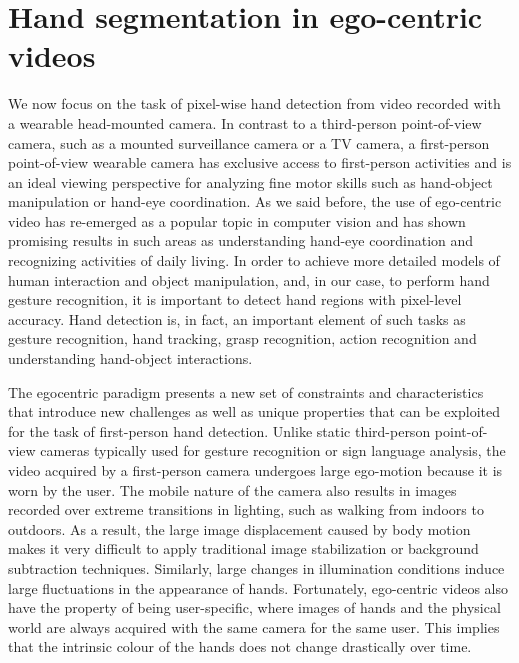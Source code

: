 
\chapter{Hand segmentation in ego-centric videos}


We now focus on the task of pixel-wise hand detection
from video recorded with a wearable head-mounted
camera. In contrast to a third-person point-of-view camera,
such as a mounted surveillance camera or a TV camera,
a first-person point-of-view wearable camera has exclusive
access to first-person activities and is an ideal viewing perspective
for analyzing fine motor skills such as hand-object
manipulation or hand-eye coordination. As we said before, the use of
ego-centric video has re-emerged as a popular topic in computer
vision and has shown promising results in such areas
as understanding hand-eye coordination and recognizing
activities of daily living. In order to achieve more
detailed models of human interaction and object manipulation, and, in our case, to perform hand gesture recognition,
it is important to detect hand regions with pixel-level
accuracy. Hand detection is, in fact, an important element of such
tasks as gesture recognition, hand tracking, grasp recognition,
action recognition and understanding hand-object interactions.

The egocentric
paradigm presents a new set of constraints and characteristics
that introduce new challenges as well as unique
properties that can be exploited for the task of first-person
hand detection. Unlike static third-person point-of-view
cameras typically used for gesture recognition or sign language
analysis, the video acquired by a first-person camera
undergoes large ego-motion because it is worn by the
user. The mobile nature of the camera also results in images
recorded over extreme transitions in lighting, such as
walking from indoors to outdoors. As a result, the large image displacement caused by body motion makes it very difficult
to apply traditional image stabilization or background
subtraction techniques. Similarly, large changes in illumination
conditions induce large fluctuations in the appearance
of hands. Fortunately, ego-centric videos also have the
property of being user-specific, where images of hands and
the physical world are always acquired with the same camera
for the same user. This implies that the intrinsic colour
of the hands does not change drastically over time.

